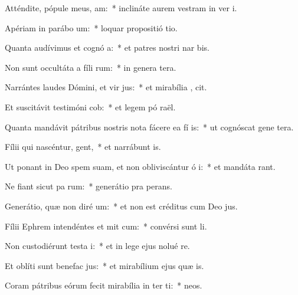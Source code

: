 \item Atténdite, pópule meus,  am:~* inclináte aurem vestram in ver  i.
\item Apériam in parábo  um:~* loquar propositió  tio.
\item Quanta audívimus et cognó a:~* et patres nostri nar bis.
\item Non sunt occultáta a fíli rum:~* in genera tera.
\item Narrántes laudes Dómini, et vir jus:~* et mirabília ,  cit.
\item Et suscitávit testimóni  cob:~* et legem pó  raël.
\item Quanta mandávit pátribus nostris nota fácere ea fí is:~* ut cognóscat gene tera.
\item Fílii qui nascéntur,  gent,~* et narrábunt  is.
\item Ut ponant in Deo spem suam, et non obliviscántur ó i:~* et mandáta  rant.
\item Ne fiant sicut pa rum:~* generátio pra  perans.
\item Generátio, quæ non diré  um:~* et non est créditus cum Deo  jus.
\item Fílii Ephrem intendéntes et mit cum:~* convérsi sunt   li.
\item Non custodiérunt testa i:~* et in lege ejus nolué re.
\item Et oblíti sunt benefac jus:~* et mirabílium ejus quæ  is.
\item Coram pátribus eórum fecit mirabília in ter ti:~*   neos.
